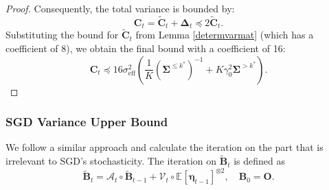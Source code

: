 \documentclass{article}
\theoremstyle{definition}
\theoremstyle{definition}
\theoremstyle{plain}
\theoremstyle{plain}
\theoremstyle{plain}
\theoremstyle{plain}
\theoremstyle{plain}
\newcommand{\bs}[1]{\boldsymbol{\mathbf{#1}}}
\newcommand{\mc}[1]{{\mathcal{#1}}}
\newcommand{\eff}{\mathrm{eff}}
\newcommand{\Sig}{\mathbf{\Sigma}}
\newcommand{\id}{\mathbf{I}}
\newcommand{\ex}[2][]{\mathbb{E}_{#1}\left[ #2 \right]}
\begin{document}
\begin{proof}
    Consequently, the total variance is bounded by:
    \begin{equation}
        \bs C_t = \tilde{\bs C}_t + \bs \Delta_t \preceq 2 \tilde{\bs C}_t.
    \end{equation}
    Substituting the bound for $\tilde{\bs C}_t$ from Lemma \ref{determvarmat} (which has a coefficient of 8), we obtain the final bound with a coefficient of 16:
    \begin{equation}
        \bs C_t \preceq 16{\sigma}_\eff^2\left( \frac{1}{K}(\Sig^{\leq k^*})^{-1} +K\gamma_0^2 \Sig^{>k^*} \right).
    \end{equation}
\end{proof}

\subsubsection{SGD Variance Upper Bound}
We follow a similar approach and calculate the iteration on the part that is irrelevant to SGD's stochasticity. The iteration on $\tilde{\bs B}_t$ is defined as
\begin{equation}
    \tilde{\bs B}_t = \mc A_t\circ \tilde{\bs B}_{t-1} + \mathcal{V}_t\circ \ex{\bs \eta_{t-1}}^{\otimes2},\quad {\bs B}_0 = \bs O.
\end{equation}

\end{document}
